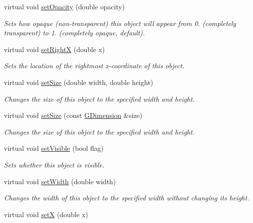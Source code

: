 \begin{DoxyCompactItemize}
virtual void \mbox{\hyperlink{classsgl_1_1GObject_a04af1866cc1bae4a1226695794a50539}{set\+Opacity}} (double opacity)
\begin{DoxyCompactList}\small\item\em Sets how opaque (non-\/transparent) this object will appear from 0. (completely transparent) to 1. (completely opaque, default). \end{DoxyCompactList}\item 
virtual void \mbox{\hyperlink{classsgl_1_1GObject_a3c90b758cdc2c911c9ef76c4360eb912}{set\+RightX}} (double x)
\begin{DoxyCompactList}\small\item\em Sets the location of the rightmost x-\/coordinate of this object. \end{DoxyCompactList}\item 
virtual void \mbox{\hyperlink{classsgl_1_1GObject_aca25d49481f9bf5fc8f7df4c086c4ce7}{set\+Size}} (double width, double height)
\begin{DoxyCompactList}\small\item\em Changes the size of this object to the specified width and height. \end{DoxyCompactList}\item 
virtual void \mbox{\hyperlink{classsgl_1_1GObject_ae2b628228f192c2702c4ce941b2af68f}{set\+Size}} (const \mbox{\hyperlink{structsgl_1_1GDimension}{G\+Dimension}} \&size)
\begin{DoxyCompactList}\small\item\em Changes the size of this object to the specified width and height. \end{DoxyCompactList}\item 
virtual void \mbox{\hyperlink{classsgl_1_1GObject_a88203f28224315d9f4471212f4af8ed3}{set\+Visible}} (bool flag)
\begin{DoxyCompactList}\small\item\em Sets whether this object is visible. \end{DoxyCompactList}\item 
virtual void \mbox{\hyperlink{classsgl_1_1GObject_aa3f3fba4cb131baa8696ba01e3bceca1}{set\+Width}} (double width)
\begin{DoxyCompactList}\small\item\em Changes the width of this object to the specified width without changing its height. \end{DoxyCompactList}\item 
virtual void \mbox{\hyperlink{classsgl_1_1GObject_a9c18fcc579333bf9653d13ad2b372e39}{setX}} (double x)

\end{DoxyCompactItemize}
